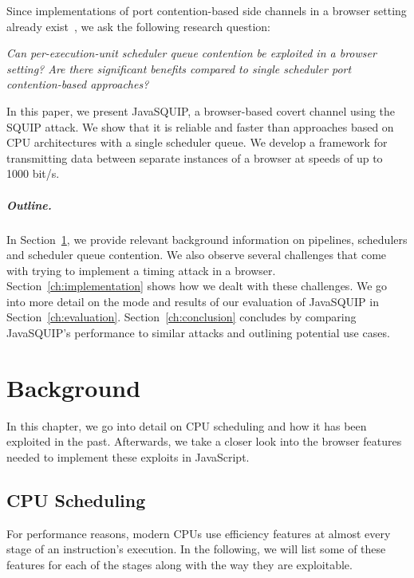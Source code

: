 \documentclass[11pt,
  titlepage=false,
]{scrreprt}
\begin{document}
Since implementations of port contention-based side channels in a browser setting already exist~\cite{Rokicki2022webport}, we ask the following research question:

\textit{Can per-execution-unit scheduler queue contention be exploited in a browser setting? Are there significant benefits compared to single scheduler port contention-based approaches?}

In this paper, we present JavaSQUIP, a browser-based covert channel using the SQUIP attack.
We show that it is reliable and faster than approaches based on CPU architectures with a single scheduler queue.
We develop a framework for transmitting data between separate instances of a browser at speeds of up to 1000 bit/s.

\paragraph{Outline.}
In Section~\ref{ch:background}, we provide relevant background information on pipelines, schedulers and scheduler queue contention.
We also observe several challenges that come with trying to implement a timing attack in a browser.
Section~\ref{ch:implementation} shows how we dealt with these challenges.
We go into more detail on the mode and results of our evaluation of JavaSQUIP in Section~\ref{ch:evaluation}.
Section~\ref{ch:conclusion} concludes by comparing JavaSQUIP's performance to similar attacks and outlining potential use cases.



\chapter{Background}
\label{ch:background}

In this chapter, we go into detail on CPU scheduling and how it has been exploited in the past.
Afterwards, we take a closer look into the browser features needed to implement these exploits in JavaScript.

\section{CPU Scheduling}
\label{sec:cpuschedulers}
For performance reasons, modern CPUs use efficiency features at almost every stage of an instruction's execution.
In the following, we will list some of these features for each of the stages along with the way they are exploitable.
\end{document}
